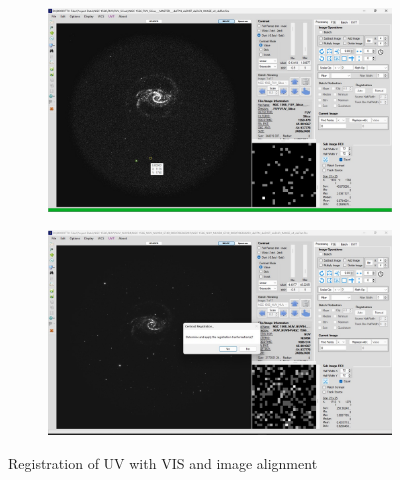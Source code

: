 \documentclass[12pt]{report}
\begin{document}
\begin{figure}[htbp]
    \begin{subfigure}{0.45\textwidth}
        \centering
        \includegraphics[width=\linewidth]{image30.png}
        \label{fig:image30}
    \end{subfigure}
    \hfill
    \begin{subfigure}{0.45\textwidth}
        \centering
        \includegraphics[width=\linewidth]{image31.png}
        \label{fig:image31}
    \end{subfigure}
    \caption*{Registration of UV with VIS and image alignment}


\end{figure}
\end{document}

